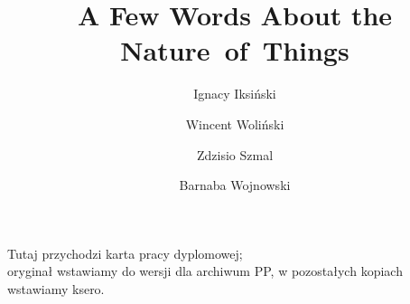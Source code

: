 \documentclass[english,bachelor,a4paper,oneside]{ppfcmthesis}
\author{%
   Ignacy Iksiński \and 
   Wincent Woliński \and 
   Zdzisio Szmal \and 
   Barnaba Wojnowski}
\title{A Few Words About the Nature~of~Things}        %
\begin{document}
\frontmatter\pagestyle{empty}%
\maketitle\cleardoublepage%

\thispagestyle{empty}\vspace*{\fill}%
\begin{center}Tutaj przychodzi karta pracy dyplomowej;\\oryginał wstawiamy do wersji dla archiwum PP, w pozostałych kopiach wstawiamy ksero.\end{center}%
\vfill\cleardoublepage%

\pagestyle{ppfcmthesis}%
\tableofcontents* \cleardoublepage%

\mainmatter%


\cleardoublepage\appendix%
%

{\raggedright\sloppy\small}

\ppcolophon
\end{document}
